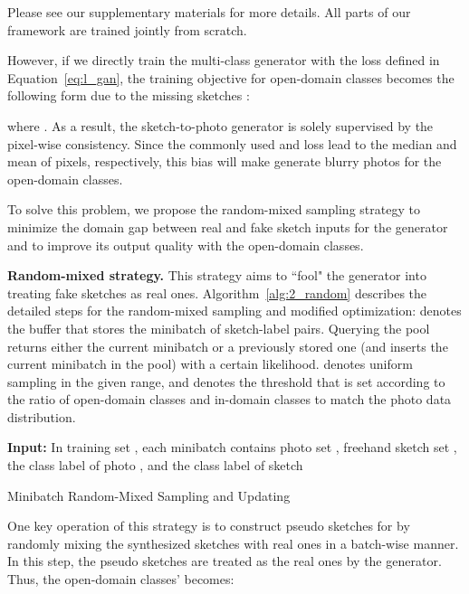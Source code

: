 \documentclass[10pt,twocolumn,letterpaper]{article}
\begin{document}
Please see our supplementary materials for more details. All parts of our framework are trained jointly from scratch. 

However, if we directly train the multi-class generator with the loss defined in Equation~\ref{eq:l_gan}, the training objective for open-domain classes  becomes the following form due to the missing sketches :  

where . As a result, the sketch-to-photo generator  is solely supervised by the pixel-wise consistency. Since the commonly used  and  loss lead to the median and mean of pixels, respectively, this bias will make  generate blurry photos for the open-domain classes.  

To solve this problem, we propose the random-mixed sampling strategy to minimize the domain gap between real and fake sketch inputs for the generator and to improve its output quality with the open-domain classes. 

\noindent \textbf{Random-mixed strategy.} This strategy aims to ``fool" the generator into treating fake sketches as real ones. Algorithm~\ref{alg:2_random} describes the detailed steps for the random-mixed sampling and modified optimization:  denotes the buffer that stores the minibatch of sketch-label pairs. Querying the pool returns either the current minibatch or a previously stored one (and inserts the current minibatch in the pool) with a certain likelihood.  denotes uniform sampling in the given range, and  denotes the threshold that is set according to the ratio of open-domain classes and in-domain classes to match the photo data distribution.

\begin{algorithm}[ht]
\SetAlgoLined
\textbf{Input:} In training set , each minibatch contains photo set , freehand sketch set , the class label of photo , and the class label of sketch \;
 \caption{Minibatch Random-Mixed Sampling and Updating}
 \label{alg:2_random}
\end{algorithm}

One key operation of this strategy is to construct pseudo sketches for  by randomly mixing the synthesized sketches with real ones in a batch-wise manner. In this step, the pseudo sketches are treated as the real ones by the generator. Thus, the open-domain classes'  becomes:
\end{document}
